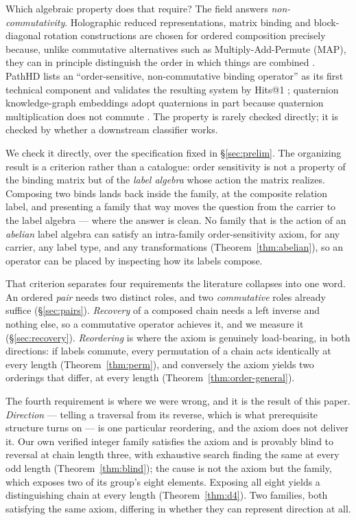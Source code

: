 \documentclass[10pt]{article}
\begin{document}
Which algebraic property does that require? The field answers \emph{non-commutativity}. Holographic reduced representations, matrix binding and block-diagonal rotation constructions are chosen for ordered composition precisely because, unlike commutative alternatives such as Multiply-Add-Permute (MAP), they can in principle distinguish the order in which things are combined \citep{plate1995holographic,gayler1998connections,gallant2013mbat,schlegel2022comparison}. PathHD lists an ``order-sensitive, non-commutative binding operator'' as its first technical component and validates the resulting system by Hits@1 \citep{liu2025pathhd}; quaternion knowledge-graph embeddings adopt quaternions in part because quaternion multiplication does not commute \citep{zhang2019quate}. The property is rarely checked directly; it is checked by whether a downstream classifier works.

We check it directly, over the specification fixed in \S\ref{sec:prelim}. The organizing result is a criterion rather than a catalogue: order sensitivity is not a property of the binding matrix but of the \emph{label algebra} whose action the matrix realizes. Composing two binds lands back inside the family, at the composite relation label, and presenting a family that way moves the question from the carrier to the label algebra --- where the answer is clean. No family that is the action of an \emph{abelian} label algebra can satisfy an intra-family order-sensitivity axiom, for any carrier, any label type, and any transformations (Theorem~\ref{thm:abelian}), so an operator can be placed by inspecting how its labels compose.

That criterion separates four requirements the literature collapses into one word. An ordered \emph{pair} needs two distinct roles, and two \emph{commutative} roles already suffice (\S\ref{sec:pairs}). \emph{Recovery} of a composed chain needs a left inverse and nothing else, so a commutative operator achieves it, and we measure it (\S\ref{sec:recovery}). \emph{Reordering} is where the axiom is genuinely load-bearing, in both directions: if labels commute, every permutation of a chain acts identically at every length (Theorem~\ref{thm:perm}), and conversely the axiom yields two orderings that differ, at every length (Theorem~\ref{thm:order-general}).

The fourth requirement is where we were wrong, and it is the result of this paper. \emph{Direction} --- telling a traversal from its reverse, which is what prerequisite structure turns on --- is one particular reordering, and the axiom does not deliver it. Our own verified integer family satisfies the axiom and is provably blind to reversal at chain length three, with exhaustive search finding the same at every odd length (Theorem~\ref{thm:blind}); the cause is not the axiom but the family, which exposes two of its group's eight elements. Exposing all eight yields a distinguishing chain at every length (Theorem~\ref{thm:d4}). Two families, both satisfying the same axiom, differing in whether they can represent direction at all.
\end{document}

